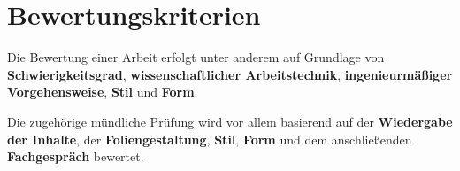 \section{Bewertungskriterien}

Die Bewertung einer Arbeit erfolgt unter anderem auf Grundlage von \textbf{Schwierigkeitsgrad},
\textbf{wissenschaftlicher Arbeitstechnik}, \textbf{ingenieurmäßiger Vorgehensweise}, \textbf{Stil} und \textbf{Form}.

\noindent
Die zugehörige mündliche Prüfung wird vor allem basierend auf der \textbf{Wiedergabe der Inhalte}, der \textbf{Foliengestaltung},
\textbf{Stil}, \textbf{Form} und dem anschließenden \textbf{Fachgespräch} bewertet.
